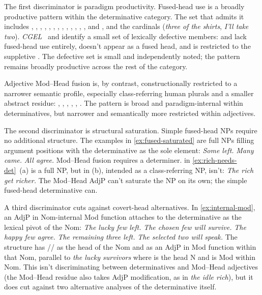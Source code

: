 \documentclass[12pt]{article}
\begin{document}
The first discriminator is paradigm productivity. Fused-head use is a broadly productive pattern within the determinative category. The set that admits it includes , , , , , , , , , , , , , and , and the cardinals (\textit{three of the shirts}, \textit{I'll take two}). \textit{CGEL}~\citep[371--2]{huddleston2002} and \textcite[22--23]{Payne2007} identify a small set of lexically defective members:  and  lack fused-head use entirely,  doesn't appear as a fused head, and  is restricted to the suppletive . The defective set is small and independently noted; the pattern remains broadly productive across the rest of the category.

Adjective Mod--Head fusion is, by contrast, constructionally restricted to a narrower semantic profile, especially class-referring human plurals and a smaller abstract residue: , , , , , . The pattern is broad and paradigm-internal within determinatives, but narrower and semantically more restricted within adjectives.

The second discriminator is structural saturation. Simple fused-head NPs require no additional structure. The examples in \ref{ex:fused-saturated} are full NPs filling argument positions with the determinative as the sole element:
\ea\label{ex:fused-saturated}
\ea \textit{Some left.}
\ex \textit{Many came.}
\ex \textit{All agree.}
\z
\z
Mod--Head fusion requires a determiner.  in \ref{ex:rich-needs-det}~(a) is a full NP, but  in (b), intended as a class-referring NP, isn't:
\ea\label{ex:rich-needs-det}
\ea \textit{The rich get richer.}
\ex {}
\z
\z
The Mod--Head AdjP can't saturate the NP on its own; the simple fused-head determinative can.

A third discriminator cuts against covert-head alternatives. In \ref{ex:internal-mod}, an AdjP in Nom-internal Mod function attaches to the determinative as the lexical pivot of the Nom:
\ea\label{ex:internal-mod}
\ea \textit{The lucky few left.}
\ex \textit{The chosen few will survive.}
\ex \textit{The happy few agree.}
\ex \textit{The remaining three left.}
\ex \textit{The selected two will speak.}
\z
\z
The structure has // as the head of the Nom and  as an AdjP in Mod function within that Nom, parallel to \textit{the lucky survivors} where  is the head N and  is Mod within Nom. This isn't discriminating between determinatives and Mod--Head adjectives (the Mod--Head residue also takes AdjP modification, as in \textit{the idle rich}), but it does cut against two alternative analyses of the determinative itself.
\end{document}
